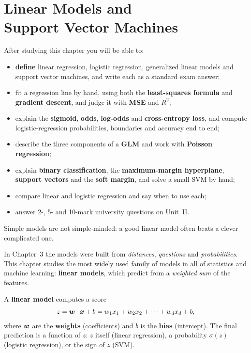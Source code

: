 \chapter[Linear Models and Support Vector Machines]{Linear Models and\\Support Vector Machines}
\label{ch:linear}
\begin{objectives}
After studying this chapter you will be able to:
\begin{itemize}
  \item \textbf{define} linear regression, logistic regression, generalized linear models and support vector machines, and write each as a standard exam answer;
  \item fit a regression line by hand, using both the \textbf{least-squares formula} and \textbf{gradient descent}, and judge it with \textbf{MSE} and $R^2$;
  \item explain the \textbf{sigmoid}, \textbf{odds}, \textbf{log-odds} and \textbf{cross-entropy loss}, and compute logistic-regression probabilities, boundaries and accuracy end to end;
  \item describe the three components of a \textbf{GLM} and work with \textbf{Poisson regression};
  \item explain \textbf{binary classification}, the \textbf{maximum-margin hyperplane}, \textbf{support vectors} and the \textbf{soft margin}, and solve a small SVM by hand;
  \item compare linear and logistic regression and say when to use each;
  \item answer 2-, 5- and 10-mark university questions on Unit~II.
\end{itemize}
\end{objectives}

\begin{pullquote}
Simple models are not simple-minded: a good linear model often beats a clever complicated one.
\end{pullquote}

In Chapter~3 the models were built from \emph{distances}, \emph{questions} and \emph{probabilities}. This chapter studies the most widely used family of models in all of statistics and machine learning: \textbf{linear models}, which predict from a \emph{weighted sum} of the features.

\begin{definition}
A \textbf{linear model} computes a score
\[
  z=\boldsymbol{w}\cdot\boldsymbol{x}+b=w_1x_1+w_2x_2+\cdots+w_dx_d+b,
\]
where $\boldsymbol{w}$ are the \textbf{weights} (coefficients) and $b$ is the \textbf{bias} (intercept). The final prediction is a function of $z$: $z$ itself (linear regression), a probability $\sigma(z)$ (logistic regression), or the sign of $z$ (SVM).
\end{definition}

